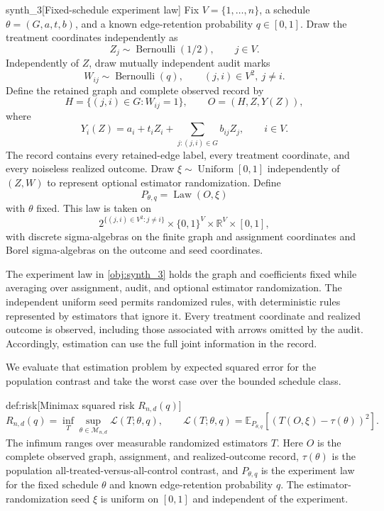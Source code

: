 \documentclass[11pt]{article}
\begin{document}
\begin{definitionv}{synth_3}[Fixed-schedule experiment law]
Fix \(V=\{1,\ldots,n\}\), a schedule \(\theta=(G,a,t,b)\), and a known edge-retention probability \(q\in[0,1]\). Draw the treatment coordinates independently as
\[
Z_j\sim\operatorname{Bernoulli}(1/2),\qquad j\in V.
\]
Independently of \(Z\), draw mutually independent audit marks
\[
W_{ij}\sim\operatorname{Bernoulli}(q),
\qquad (j,i)\in V^2,\ j\ne i.
\]
Define the retained graph and complete observed record by
\[
H=\{(j,i)\in G:W_{ij}=1\},
\qquad
O=(H,Z,Y(Z)),
\]
where
\[
Y_i(Z)=a_i+t_iZ_i+\sum_{j:(j,i)\in G}b_{ij}Z_j,
\qquad i\in V.
\]
The record contains every retained-edge label, every treatment coordinate, and every noiseless realized outcome. Draw \(\xi\sim\operatorname{Uniform}[0,1]\) independently of \((Z,W)\) to represent optional estimator randomization. Define
\[
P_{\theta,q}=\operatorname{Law}(O,\xi)
\]
with \(\theta\) fixed. This law is taken on
\[
2^{\{(j,i)\in V^2:j\ne i\}}
\times\{0,1\}^V\times\mathbb R^V\times[0,1],
\]
with discrete sigma-algebras on the finite graph and assignment coordinates and Borel sigma-algebras on the outcome and seed coordinates.
\end{definitionv}

The experiment law  in \cref{obj:synth_3} holds the graph and coefficients fixed while averaging over assignment, audit, and optional estimator randomization. The independent uniform seed  permits randomized rules, with deterministic rules represented by estimators that ignore it. Every treatment coordinate and realized outcome is observed, including those associated with arrows omitted by the audit. Accordingly, estimation can use the full joint information in the record.

We evaluate that estimation problem by expected squared error for the population contrast and take the worst case over the bounded schedule class.

\begin{definitionv}{def:risk}[Minimax squared risk $R_{n,d}(q)$]
\[
R_{n,d}(q)
=
\inf_T\sup_{\theta\in\mathcal M_{n,d}}\mathcal L(T;\theta,q),
\qquad
\mathcal L(T;\theta,q)
=
\mathbb E_{P_{\theta,q}}
\left[(T(O,\xi)-\tau(\theta))^2\right].
\]
The infimum ranges over measurable randomized estimators \(T\). Here \(O\) is the complete observed graph, assignment, and realized-outcome record, \(\tau(\theta)\) is the population all-treated-versus-all-control contrast, and \(P_{\theta,q}\) is the experiment law for the fixed schedule \(\theta\) and known edge-retention probability \(q\). The estimator-randomization seed \(\xi\) is uniform on \([0,1]\) and independent of the experiment.
\end{definitionv}
\end{document}
